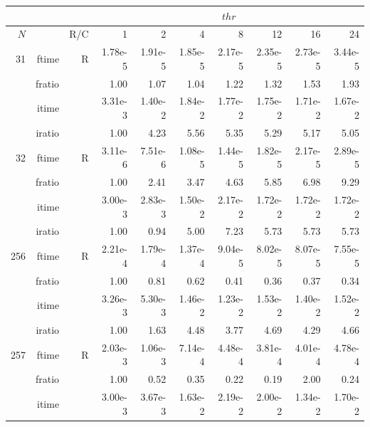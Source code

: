\documentclass[a4paper]{article}
\begin{document}
\begin{table}[htbp]
\begin{center}
\begin{small}
\begin{tabular}{|r|r|r|r|r|r|r|r|r|r|}
\hline 
     \multicolumn{3}{|c|}{ } & \multicolumn{7}{c|}{$thr$} \\ \hline
    $N$  & & R/C  & 1           & 2    & 4    & 8    & 12   & 16    & 24  \\ \hline\hline
    31  & ftime & R  &  1.78e-5 &   1.91e-5 &   1.85e-5 &   2.17e-5 &   2.35e-5 &   2.73e-5 &   3.44e-5    \\ 
    & fratio & &      1.00 &   1.07 &   1.04 &   1.22 &   1.32 &   1.53 &   1.93      \\ 
     & itime & &        3.31e-3 &   1.40e-2 &   1.84e-2 &   1.77e-2 &   1.75e-2 &   1.71e-2 &   1.67e-2      \\ 
     & iratio & &       1.00 &   4.23 &   5.56 &   5.35 &   5.29 &   5.17 &   5.05       \\ \hline 
    32  & ftime & R  &  3.11e-6 &   7.51e-6 &   1.08e-5 &   1.44e-5 &   1.82e-5 &   2.17e-5 &   2.89e-5    \\ 
      & fratio & &      1.00 &   2.41 &   3.47 &   4.63 &   5.85 &   6.98 &   9.29      \\ 
     & itime & &        3.00e-3 &   2.83e-3 &   1.50e-2 &   2.17e-2 &   1.72e-2 &   1.72e-2 &   1.72e-2      \\ 
     & iratio & &       1.00 &   0.94 &   5.00 &   7.23 &   5.73 &   5.73 &   5.73      \\ \hline 
   256  & ftime & R  &  2.21e-4 &   1.79e-4 &   1.37e-4 &   9.04e-5 &   8.02e-5 &   8.07e-5 &   7.55e-5    \\ 
      & fratio & &      1.00 &   0.81 &   0.62 &   0.41 &   0.36 &   0.37 &   0.34      \\ 
     & itime & &        3.26e-3 &   5.30e-3 &   1.46e-2 &   1.23e-2 &   1.53e-2 &   1.40e-2 &   1.52e-2     \\ 
     & iratio & &       1.00 &   1.63 &   4.48 &   3.77 &   4.69 &   4.29 &   4.66      \\ \hline 
   257  & ftime & R  &  2.03e-3 &   1.06e-3 &   7.14e-4 &   4.48e-4 &   3.81e-4 &   4.01e-4 &   4.78e-4    \\ 
      & fratio & &      1.00 &   0.52 &   0.35 &   0.22 &   0.19 &   2.00 &   0.24      \\ 
     & itime & &        3.00e-3 &   3.67e-3 &   1.63e-2 &   2.19e-2 &   2.00e-2 &   1.34e-2 &   1.70e-2      \\ 

\end{tabular}
\end{small}
\end{center}
\end{table}
\end{document}

